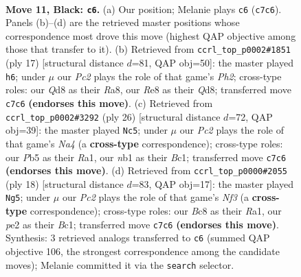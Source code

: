 \documentclass[11pt]{article}
\begin{document}
\clearpage

\begin{figure}[p]\centering
\begin{subfigure}{0.46\textwidth}\centering
\resizebox{\linewidth}{!}{%
\newchessgame
\chessboard[
  setfen={rnbqr1k1/p1p1bppp/4p3/1p1n4/3P4/3Q1BP1/PP1NPP1P/RNB2RK1 b - - 1 11},
  showmover=false,
  pgfstyle=straightmove, color=movearrow, markmove={c7-c6}
]}
\caption{}
\end{subfigure}\hfill
\begin{subfigure}{0.46\textwidth}\centering
\resizebox{\linewidth}{!}{%
\newchessgame
\chessboard[
  setfen={r2qk1nr/1pp1b1pp/p1npb3/4p3/B3P3/2P2N2/PP1N1PPP/R1BQ1RK1 b kq - 2 9},
  showmover=false,
  pgfstyle=straightmove, color=movearrow, markmove={h7-h6}
]}
\caption{}
\end{subfigure}
\\[4pt]
\begin{subfigure}{0.46\textwidth}\centering
\resizebox{\linewidth}{!}{%
\newchessgame
\chessboard[
  setfen={rn3rk1/p3ppbp/b2q1np1/3p4/N2P4/3B1N1P/PP3PP1/R1BQ1RK1 w - - 4 14},
  showmover=false,
  pgfstyle=straightmove, color=movearrow, markmove={a4-c5}
]}
\caption{}
\end{subfigure}\hfill
\begin{subfigure}{0.46\textwidth}\centering
\resizebox{\linewidth}{!}{%
\newchessgame
\chessboard[
  setfen={r1b1k2r/ppqn1ppp/4pn2/2b5/8/2NB1N1P/PPP2PP1/R1BQ1RK1 w kq - 4 10},
  showmover=false,
  pgfstyle=straightmove, color=movearrow, markmove={f3-g5}
]}
\caption{}
\end{subfigure}
\caption{\textbf{Move 11, Black: \texttt{c6}.} (a) Our position; Melanie plays \texttt{c6} (\texttt{c7c6}). Panels (b)--(d) are the retrieved master positions whose correspondence most drove this move (highest QAP objective among those that transfer to it). (b) Retrieved from \texttt{ccrl\_top\_p0002\#1851} (ply 17) [structural distance $d$=81, QAP obj=50]: the master played \texttt{h6}; under $\mu$ our \emph{Pc2} plays the role of that game's \emph{Ph2}; cross-type roles: our \emph{Q}d8 as their \emph{R}a8, our \emph{R}e8 as their \emph{Q}d8; transferred move \texttt{c7c6} \textbf{(endorses this move)}. (c) Retrieved from \texttt{ccrl\_top\_p0002\#3292} (ply 26) [structural distance $d$=72, QAP obj=39]: the master played \texttt{Nc5}; under $\mu$ our \emph{Pc2} plays the role of that game's \emph{Na4} (a \textbf{cross-type} correspondence); cross-type roles: our \emph{P}b5 as their \emph{R}a1, our \emph{n}b1 as their \emph{B}c1; transferred move \texttt{c7c6} \textbf{(endorses this move)}. (d) Retrieved from \texttt{ccrl\_top\_p0000\#2055} (ply 18) [structural distance $d$=83, QAP obj=17]: the master played \texttt{Ng5}; under $\mu$ our \emph{Pc2} plays the role of that game's \emph{Nf3} (a \textbf{cross-type} correspondence); cross-type roles: our \emph{B}c8 as their \emph{R}a1, our \emph{p}e2 as their \emph{B}c1; transferred move \texttt{c7c6} \textbf{(endorses this move)}. Synthesis: 3 retrieved analogs transferred to \texttt{c6} (summed QAP objective 106, the strongest correspondence among the candidate moves); Melanie committed it via the \texttt{search} selector.}
\label{fig:thought-m21}
\end{figure}
\end{document}
